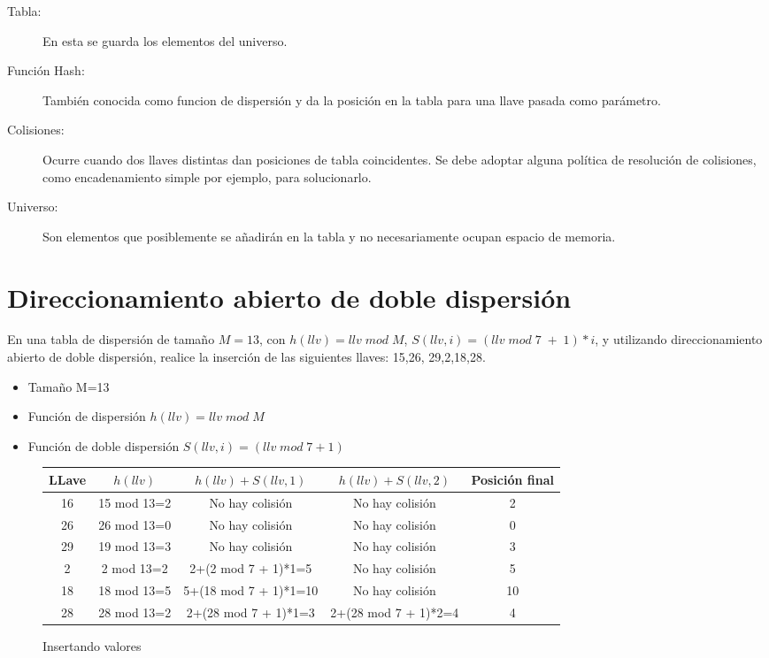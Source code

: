\begin{description}
\item[Tabla: ] En esta se guarda los elementos del universo.
\item[Función Hash: ] También conocida como funcion de dispersión y da
  la posición en la tabla para una llave pasada como parámetro.
\item[Colisiones: ] Ocurre cuando dos llaves distintas dan posiciones
  de tabla coincidentes. Se debe adoptar alguna política de resolución
  de colisiones, como encadenamiento simple por ejemplo, para
  solucionarlo.
\item[Universo: ] Son elementos que posiblemente se añadirán en la
  tabla y no necesariamente ocupan espacio de memoria.
\end{description}


\section{Direccionamiento abierto de doble dispersión}

En una tabla de dispersión de tamaño $M=13$, con $h(llv)=llv \;mod\; M$,
$S(llv,i)=(llv \;mod\; 7\; + \;1)*i$, y utilizando direccionamiento abierto de
doble dispersión, realice la inserción de las siguientes llaves:
15,26, 29,2,18,28.

\begin{itemize}
\item Tamaño M=13
\item Función de dispersión $h(llv)=llv\; mod \;M$
\item Función de doble dispersión $S(llv,i)=(llv \;mod\; 7+1)$
\end{itemize}


\begin{figure}[H]
  \centering
  \begin{tabular}{|c|c|c|c|c|}
    \hline 
    LLave & $h(llv)$ & $h(llv)+S(llv,1)$ & $h(llv)+S(llv,2)$ &Posición final\\
    \hline
    16    & 15 mod 13=2 & No hay colisión       & No hay colisión &  2\\
    26    & 26 mod 13=0 & No hay colisión       & No hay colisión &  0\\
    29    & 19 mod 13=3 & No hay colisión       & No hay colisión &  3\\
    2     &  2 mod 13=2 & 2+(2 mod 7 + 1)*1=5   & No hay colisión &  5\\
    18    & 18 mod 13=5 & 5+(18 mod 7 + 1)*1=10 & No hay colisión &  10\\
    28    & 28 mod 13=2 & 2+(28 mod 7 + 1)*1=3  & 2+(28 mod 7 + 1)*2=4& 4\\
    \hline
  \end{tabular}
  \caption{Insertando valores}
\end{figure}



